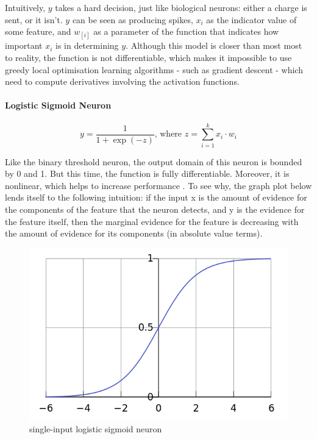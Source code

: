 \documentclass[a4paper,11pt]{article}
\begin{document}
Intuitively, $y$ takes a hard decision, just like biological neurons: either a charge is sent, or it isn't. $y$ can be seen as producing spikes, $x_{i}$ as the indicator value of some feature, and $w_[i]$ as a parameter of the function that indicates how important $x_{i}$ is in determining $y$. Although this model is closer than most most to reality, the function is not differentiable, which makes it impossible to use greedy local optimisation learning algorithms - such as gradient descent - which need to compute derivatives involving the activation functions.

\paragraph{Logistic Sigmoid Neuron} 
\begin{equation}
\label{sigmoid neuron}
y = \frac{1}{1 + \exp(-z)} \text{, where } z = \sum\limits_{i=1}^k x_{i}\cdot w_{i}
\end{equation}

Like the binary threshold neuron, the output domain of this neuron is bounded by 0 and 1. But this time, the function is fully differentiable. Moreover, it is nonlinear, which helps to increase performance \cite{DL-book}. To see why, the graph plot below lends itself to the following intuition: if the input x is the amount of evidence for the components of the feature that the neuron detects, and y is the evidence for the feature itself, then the marginal evidence for the feature is decreasing with the amount of evidence for its components (in absolute value terms). 

\begin{figure}[h!]
	\centering
	\includegraphics[scale=0.3]{images/sigmoid.png}
	\caption{single-input logistic sigmoid neuron}
    \label{f9}
\end{figure}
\end{document}
